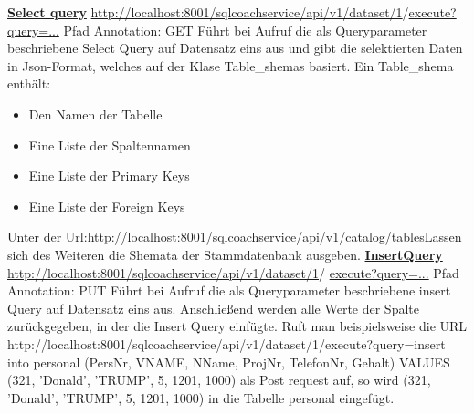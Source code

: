 \documentclass[fleqn,10pt,ngerman]{SelfArx}
\begin{document}
	\newpage
	\underline{\textbf{Select query}}\newline
	\underline{http://localhost:8001/sqlcoachservice/api/v1/dataset/1}/\newline \underline{execute?query=...}\newline
	Pfad Annotation: GET\newline
	Führt bei Aufruf  die als Queryparameter beschriebene Select Query auf Datensatz eins aus und gibt die selektierten Daten in Json-Format, welches auf der Klase Table\_shemas basiert. \newline
	Ein Table\_shema enthält:
	        \begin{itemize}
	        	\item Den Namen der Tabelle
	        	\item Eine Liste der Spaltennamen
	        	\item Eine Liste der Primary Keys
	        	\item  Eine Liste der Foreign Keys  
	        \end{itemize}
    Unter der Url:\newline \underline{http://localhost:8001/sqlcoachservice/api/v1/catalog/tables}\newline   Lassen sich des Weiteren die Shemata der Stammdatenbank ausgeben.
    \noindent
    \underline{\textbf{InsertQuery}}\newline    
    	\underline{http://localhost:8001/sqlcoachservice/api/v1/dataset/1}/\newline
    	 \underline{execute?query=...}\newline
    	 Pfad Annotation: PUT\newline
    	 	Führt bei Aufruf  die als Queryparameter beschriebene insert Query auf Datensatz eins aus. 
    	 	Anschließend werden alle Werte der Spalte zurückgegeben, in der die Insert Query einfügte.
    	 	Ruft man beispielsweise die URL http://localhost:8001/sqlcoachservice/api/v1/dataset/1/execute?query=insert into personal  (PersNr, VNAME, NName, ProjNr, TelefonNr, Gehalt)
    	 	VALUES (321, 'Donald',	'TRUMP',	5, 1201, 1000) als Post request auf, so wird  (321, 'Donald',	'TRUMP',	5, 1201, 1000) in die Tabelle personal eingefügt. 
\end{document}
